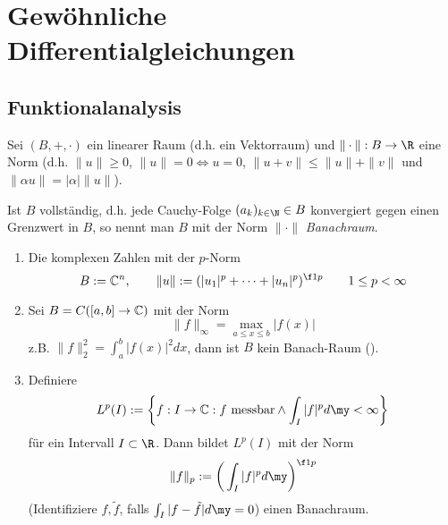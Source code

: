 \documentclass[a4paper,10pt]{scrbook}
\begin{document}
\chapter{Gewöhnliche Differentialgleichungen}


\section{Funktionalanalysis} %


\begin{df} \label{1.1}
	Sei $(B,+,\cdot)$ ein linearer Raum (d.h. ein Vektorraum) und $\|\cdot\|: B \to \R$ eine Norm (d.h. $\|u\| \ge 0$, $\|u\|=0 \iff u = 0$, $\|u+v\| \le \|u\| + \|v\|$ und $\|\alpha u \| = |\alpha| \|u\|$).

	Ist $B$ vollständig, d.h. jede Cauchy-Folge $(a_k)_{k\in \N} \in B$ konvergiert gegen einen Grenzwert in $B$, so nennt man $B$ mit der Norm $\|\cdot\|$ \emph{Banachraum}.
\end{df}

\begin{ex} \label{1.2}
	\begin{enumerate}[1)]
		\item
			Die komplexen Zahlen mit der $p$-Norm
			\[
				B := \C^n,
				\qquad \|u\| := (|u_1|^p + \dotsb + |u_n|^p)^{\f 1p} \qquad 1 \le p < \infty
			\]
		\item
			Sei $B = C([a,b] \to \mathbb{C})$ mit der Norm
			\[
				\|f\|_\infty = \max_{a \le x \le b} |f(x)|
			\]
			z.B. $\|f\|_2^2 = \int_a^b |f(x)|^2 dx$, dann ist $B$ kein Banach-Raum (\fixme[warum?]).
		\item
			Definiere
			\[
				L^p(I) := \bigg\{ f : I \to \C : f \text{ messbar} \land \int_I |f|^p d\my < \infty \bigg\}
			\]
			für ein Intervall $I \subset \R$.
			Dann bildet $L^p(I)$ mit der Norm
			\[
				\|f\|_p := \bigg( \int_I |f|^p d\my \bigg)^{\f 1p}
			\]
			(Identifiziere $f,\tilde f$, falls $\int_I |f-\tilde f| d\my = 0$)
			einen Banachraum.
	\end{enumerate}
\end{ex}
\end{document}
